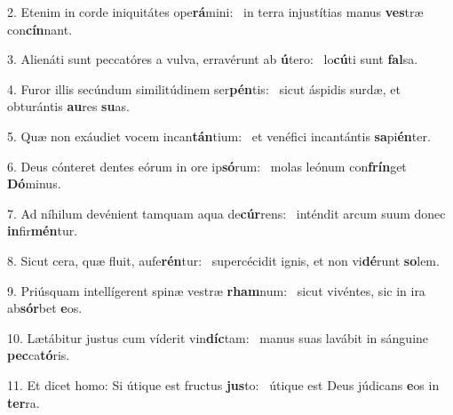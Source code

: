 2. Etenim in corde iniquitátes ope\textbf{rá}mini: \ast\  in terra injustítias manus \textbf{ves}træ con\textbf{cín}nant.\

3. Alienáti sunt peccatóres a vulva, erravérunt ab \textbf{ú}tero: \ast\  lo\textbf{cú}ti sunt \textbf{fal}sa.\

4. Furor illis secúndum similitúdinem ser\textbf{pén}tis: \ast\  sicut áspidis surdæ, et obturántis \textbf{au}res \textbf{su}as.\

5. Quæ non exáudiet vocem incan\textbf{tán}tium: \ast\  et venéfici incantántis \textbf{sa}pi\textbf{én}ter.\

6. Deus cónteret dentes eórum in ore ip\textbf{só}rum: \ast\  molas leónum con\textbf{frín}get \textbf{Dó}minus.\

7. Ad níhilum devénient tamquam aqua de\textbf{cúr}rens: \ast\  inténdit arcum suum donec \textbf{in}fir\textbf{mén}tur.\

8. Sicut cera, quæ fluit, aufe\textbf{rén}tur: \ast\  supercécidit ignis, et non vi\textbf{dé}runt \textbf{so}lem.\

9. Priúsquam intellígerent spinæ vestræ \textbf{rham}num: \ast\  sicut vivéntes, sic in ira ab\textbf{sór}bet \textbf{e}os.\

10. Lætábitur justus cum víderit vin\textbf{díc}tam: \ast\  manus suas lavábit in sánguine \textbf{pec}ca\textbf{tó}ris.\

11. Et dicet homo: Si útique est fructus \textbf{jus}to: \ast\  útique est Deus júdicans \textbf{e}os in \textbf{ter}ra.\

